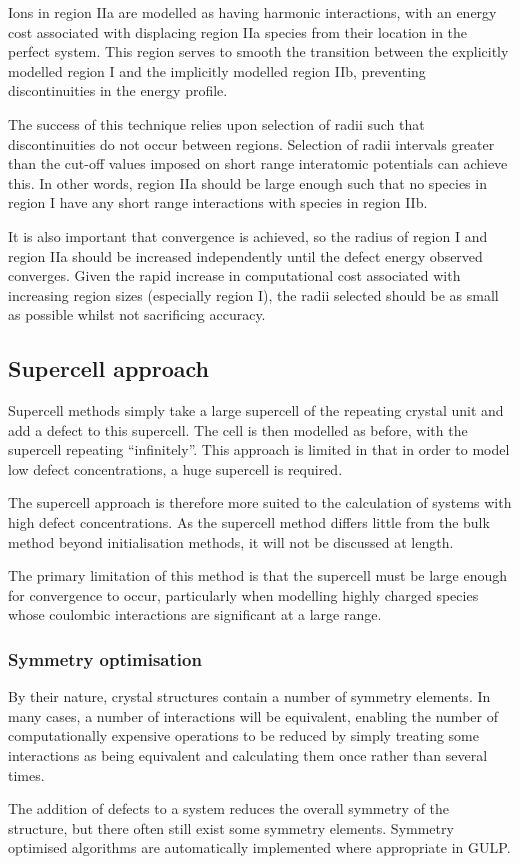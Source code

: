 Ions in region IIa are modelled as having harmonic interactions, with an energy cost associated with displacing region IIa species from their location in the perfect system.
This region serves to smooth the transition between the explicitly modelled region I and the implicitly modelled region IIb, preventing discontinuities in the energy profile.

The success of this technique relies upon selection of radii such that discontinuities do not occur between regions.
Selection of radii intervals greater than the cut-off values imposed on short range interatomic potentials can achieve this.
In other words, region IIa should be large enough such that no species in region I have any short range interactions with species in region IIb.

It is also important that convergence is achieved, so the radius of region I and region IIa should be increased independently until the defect energy observed converges.
Given the rapid increase in computational cost associated with increasing region sizes (especially region I), the radii selected should be as small as possible whilst not sacrificing accuracy.

\subsection{Supercell approach}
Supercell methods simply take a large supercell of the repeating crystal unit and add a defect to this supercell.
The cell is then modelled as before, with the supercell repeating ``infinitely''.
This approach is limited in that in order to model low defect concentrations, a huge supercell is required.

The supercell approach is therefore more suited to the calculation of systems with high defect concentrations.
As the supercell method differs little from the bulk method beyond initialisation methods, it will not be discussed at length.

The primary limitation of this method is that the supercell must be large enough for convergence to occur, particularly when modelling highly charged species whose coulombic interactions are significant at a large range.

\subsubsection{Symmetry optimisation}
By their nature, crystal structures contain a number of symmetry elements.
In many cases, a number of interactions will be equivalent, enabling the number of computationally expensive operations to be reduced by simply treating some interactions as being equivalent and calculating them once rather than several times.

The addition of defects to a system reduces the overall symmetry of the structure, but there often still exist some symmetry elements.
Symmetry optimised algorithms are automatically implemented where appropriate in GULP.

\newpage


